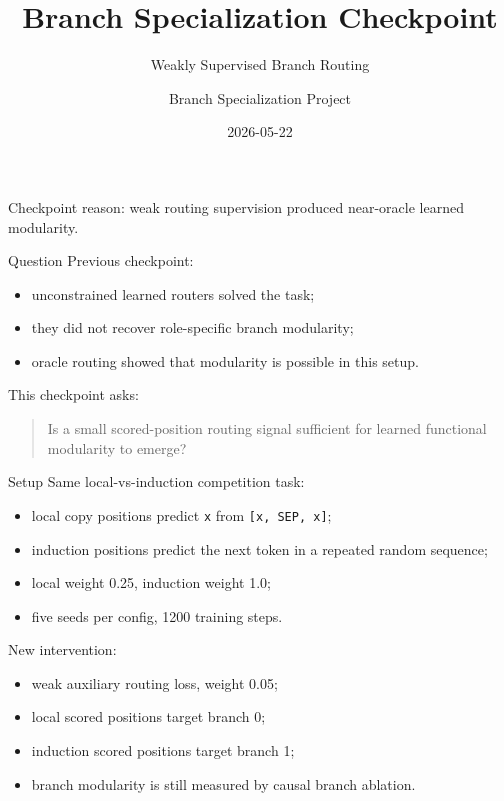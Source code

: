 \documentclass[aspectratio=169]{beamer}
\title{Branch Specialization Checkpoint}
\subtitle{Weakly Supervised Branch Routing}
\author{Branch Specialization Project}
\date{2026-05-22}
\begin{document}
\begin{frame}
  \titlepage
  \vspace{-0.5em}
  \begin{center}
    Checkpoint reason: weak routing supervision produced near-oracle learned modularity.
  \end{center}
\end{frame}

\begin{frame}{Question}
  Previous checkpoint:
  \begin{itemize}
    \item unconstrained learned routers solved the task;
    \item they did not recover role-specific branch modularity;
    \item oracle routing showed that modularity is possible in this setup.
  \end{itemize}

  \vspace{0.8em}
  This checkpoint asks:

  \begin{quote}
    Is a small scored-position routing signal sufficient for learned functional
    modularity to emerge?
  \end{quote}
\end{frame}

\begin{frame}{Setup}
  Same local-vs-induction competition task:
  \begin{itemize}
    \item local copy positions predict \texttt{x} from \texttt{[x, SEP, x]};
    \item induction positions predict the next token in a repeated random sequence;
    \item local weight 0.25, induction weight 1.0;
    \item five seeds per config, 1200 training steps.
  \end{itemize}

  \vspace{0.6em}
  New intervention:
  \begin{itemize}
    \item weak auxiliary routing loss, weight 0.05;
    \item local scored positions target branch 0;
    \item induction scored positions target branch 1;
    \item branch modularity is still measured by causal branch ablation.
  \end{itemize}
\end{frame}
\end{document}
